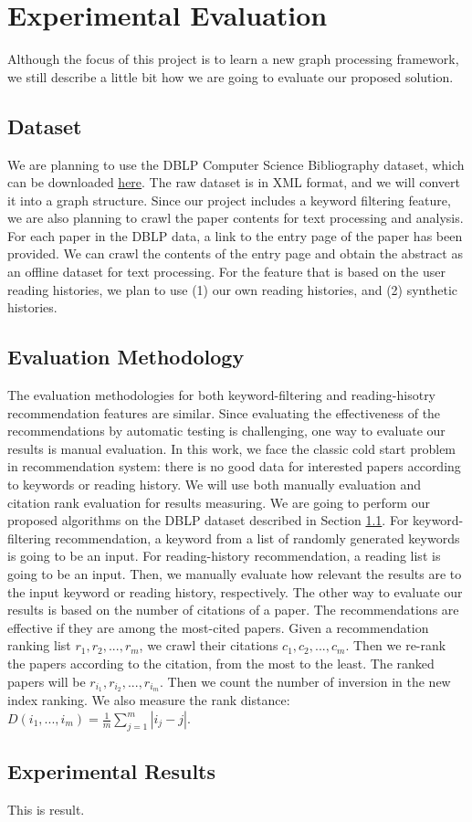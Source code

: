 \section{Experimental Evaluation}
%
Although the focus of this project is to learn a new graph processing framework, we still describe a little bit how we are going to evaluate our proposed solution.
%
\subsection{Dataset} \label{dataset}
%
We are planning to use the DBLP Computer Science Bibliography dataset, which can be downloaded \href{https://dblp.uni-trier.de/xml/}{\underline{here}}.
%
The raw dataset is in XML format, and we will convert it into a graph structure.
%
Since our project includes a keyword filtering feature, we are also planning to crawl the paper contents for text processing and analysis.
%
For each paper in the DBLP data, a link to the entry page of the paper has been provided.
%
We can crawl the contents of the entry page and obtain the abstract as an offline dataset for text processing.
%
For the feature that is based on the user reading histories, we plan to use (1) our own reading histories, and (2) synthetic histories.
%
\subsection{Evaluation Methodology}
%
The evaluation methodologies for both keyword-filtering and reading-hisotry recommendation features are similar.
%
Since evaluating the effectiveness of the recommendations by automatic testing is challenging, one way to evaluate our results is manual evaluation. In this work, we face the classic cold start problem in recommendation system: there is no good data for interested papers according to keywords or reading history. We will use both manually evaluation and citation rank evaluation for results measuring.
%
We are going to perform our proposed algorithms on the DBLP dataset described in Section \ref{dataset}.
%
For keyword-filtering recommendation, a keyword from a list of randomly generated keywords is going to be an input.
%
For reading-history recommendation, a reading list is going to be an input.
%
Then, we manually evaluate how relevant the results are to the input keyword or reading history, respectively.
%
The other way to evaluate our results is based on the number of citations of a paper. The recommendations are effective if they are among the most-cited papers.
%
Given a recommendation ranking list $r_1, r_2, ..., r_m$, we crawl their citations $c_1, c_2, ..., c_m$. Then we re-rank the papers according to the citation, from the most to the least. The ranked papers will be $r_{i_1}, r_{i_2},..., r_{i_m}$. Then we count the number of inversion in the new index ranking. We also measure the rank distance: $D(i_1, ..., i_m) = \frac{1}{m} \sum_{j=1}^m |i_j - j|$.
%


\subsection{Experimental Results}
%
This is result.
